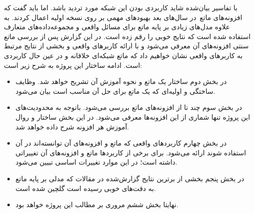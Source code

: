با تفاسیر بیان‌شده شاید کاربردی بودن این شبکه مورد تردید باشد. اما باید گفت که افزونه‌های ماتع\cite{gulcehre2018dynamic}\cite{merrild2018hyperntm}\ در سال‌های بعد بهبودهای مهمی بر روی نسخه اولیه اعمال کردند. به علاوه مدل‌های زیادی بر پایه ماتع برای مسائل واقعی و مجموعه‌داده‌های متعارف استفاده شده است که نتایج خوبی را رقم زده است. در این گزارش پس از بررسی ماتع سنتی افزونه‌های آن معرفی می‌شود و با ارائه کاربرهای واقعی و بخشی از نتایج مرتبط به کاربرهای واقعی نشان خواهیم داد که ماتع شبکه‌ای خلاقانه و در عین حال کاربردی است. ادامه ساختار این پروژه به شرح زیر است:
\begin{itemize}
\item در بخش دوم ساختار یک ماتع و نحوه آموزش آن تشریح خواهد شد. وظایف ساختگی و اولیه‌ای که یک ماتع برای حل آن مناسب است بیان می‌شود.
\item در بخش سوم چند تا از افزونه‌های ماتع بررسی می‌شود. باتوجه به محدودیت‌های این پروژه تنها شماری از این افزونه‌ها معرفی می‌شود. در این بخش ساختار و روال آموزش هر افزونه شرح داده خواهد شد.
\item در بخش چهارم کاربردهای واقعی که ماتع و افزونه‌های آن توانسته‌اند در آن استفاده شوند ارائه می‌شود. برای برخی از کاربردها ماتع و افزونه‌های آن تغییراتی داشته است؛ در این موارد تغییرات اساسی تبیین می‌شود.
\item در بخش پنجم بخشی از برترین نتایج گزارش‌شده در مقالات که مدلی بر پایه ماتع به دقت‌های خوبی رسیده است گلچین شده است.
\item نهایتا بخش ششم مروری بر مطالب این پروژه خواهد بود.  
\end{itemize}